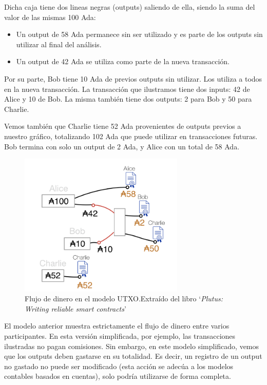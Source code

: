 \documentclass[12pt]{book}
\begin{document}
Dicha caja tiene dos lineas negras (outputs) saliendo de ella, siendo la suma del valor de las mismas 100 Ada:

\begin{itemize}
    \item Un output de 58 Ada permanece sin ser utilizado y es parte de los outputs sin utilizar al final del análisis.
    \item Un output de 42 Ada se utiliza como parte de la nueva transacción.
\end{itemize}

Por su parte, Bob tiene 10 Ada de previos outputs sin utilizar. Los utiliza a todos en la nueva transacción. La transacción que ilustramos tiene dos inputs: 42 de Alice y 10 de Bob. La misma también tiene dos outputs: 2 para Bob y 50 para Charlie.

Vemos también que Charlie tiene 52 Ada provenientes de outputs previos a nuestro gráfico, totalizando 102 Ada que puede utilizar en transacciones futuras. Bob termina con solo un output de 2 Ada, y Alice con un total de 58 Ada.

\begin{figure}
    \centering
    \includegraphics[width=0.7\textwidth]{UTXO_Funds_Flow_Example.png}
    \caption{Flujo de dinero en el modelo UTXO.\@ Extraído del libro `\textit{Plutus: Writing reliable smart contracts}'}\label{fig:UTXO_Funds_Flow_Example}
\end{figure}

El modelo anterior muestra estrictamente el flujo de dinero entre varios participantes. En esta versión simplificada, por ejemplo, las transacciones ilustradas no pagan comisiones. Sin embargo, en este modelo simplificado, vemos que los outputs deben gastarse en su totalidad. Es decir, un registro de un output no gastado no puede ser modificado (esta acción se adecúa a los modelos contables basados en cuentas), solo podría utilizarse de forma completa.
\end{document}
